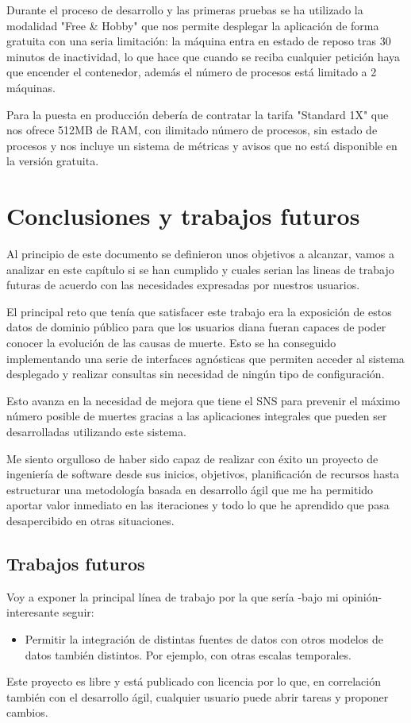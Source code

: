 Durante el proceso de desarrollo y las primeras pruebas se ha utilizado la modalidad "Free
\& Hobby" que nos permite desplegar la aplicación de forma gratuita con una seria
limitación: la máquina entra en estado de reposo tras 30 minutos de inactividad, lo que
hace que cuando se reciba cualquier petición haya que encender el contenedor, además el
número de procesos está limitado a 2 máquinas.

Para la puesta en producción debería de contratar la tarifa "Standard 1X" que nos ofrece
512MB de RAM, con ilimitado número de procesos, sin estado de procesos y nos incluye un
sistema de métricas y avisos que no está disponible en la versión gratuita.

\chapter{Conclusiones y trabajos futuros}
Al principio de este documento se definieron unos objetivos a alcanzar, vamos a analizar
en este capítulo si se han cumplido y cuales serian las lineas de trabajo futuras de
acuerdo con las necesidades expresadas por nuestros usuarios.

El principal reto que tenía que satisfacer este trabajo era la exposición de estos datos
de dominio público para que los usuarios diana fueran capaces de poder conocer la
evolución de las causas de muerte. Esto se ha conseguido implementando una serie de
interfaces agnósticas que permiten acceder al sistema desplegado y realizar consultas sin
necesidad de ningún tipo de configuración. 

Esto avanza en la necesidad de mejora que tiene el \Gls{SNS} para prevenir el máximo número
posible de muertes gracias a las aplicaciones integrales que pueden ser desarrolladas
utilizando este sistema.

Me siento orgulloso de haber sido capaz de realizar con éxito un proyecto de ingeniería de
software desde sus inicios, objetivos, planificación de recursos hasta estructurar una
metodología basada en desarrollo ágil que me ha permitido aportar valor inmediato en las
iteraciones y todo lo que he aprendido que pasa desapercibido en otras situaciones.

\section{Trabajos futuros}
Voy a exponer la principal línea de trabajo por la que sería -bajo mi opinión- interesante seguir:
\begin{itemize}
    \item Permitir la integración de distintas fuentes de datos con otros modelos de datos
    también distintos. Por ejemplo, con otras escalas temporales.
\end{itemize}
Este proyecto es libre y está publicado con licencia \cite{gplv3} por lo que, en
correlación también con el desarrollo ágil, cualquier usuario puede abrir tareas y
proponer cambios.